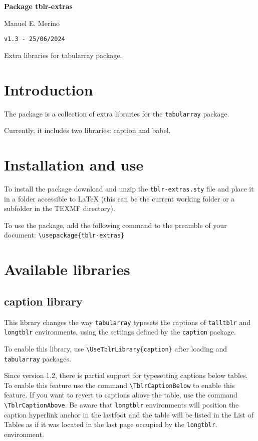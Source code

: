 \documentclass[a4paper,11pt]{article}
\newcommand{\Version}{1.3}
\begin{document}
	\begingroup%
	\centering
	\LARGE\textbf{Package \color{udep}tblr-extras}\par
	\large Manuel E. Merino\par
	\texttt{v\Version{} - 25/06/2024}\par
	\normalsize Extra libraries for tabularray package.\par
	\endgroup
	\tableofcontents
	\clearpage

	\section{Introduction}
	The \tblrextras{} package is a collection of extra libraries for the \texttt{tabularray} package.

	Currently, it includes two libraries: caption and babel.

	\section{Installation and use}

	To install the \tblrextras{} package download and unzip the \texttt{tblr-extras.sty} file and place it in a folder accessible to \LaTeX{} (this can be the current working folder or a subfolder in the TEXMF directory).

	To use the \tblrextras{} package, add the following command to the preamble of your document: \verb|\usepackage{tblr-extras}|

	\section{Available libraries}
	\subsection{caption library}

	This \tblrextras{} library changes the way \texttt{tabularray} typesets the captions of \texttt{talltblr} and \texttt{longtblr} environments, using the settings defined by the \texttt{caption} package.

	To enable this library, use \verb*|\UseTblrLibrary{caption}| after loading \tblrextras{} and \texttt{tabularray} packages.

	Since version 1.2, there is partial support for typesetting captions below tables. To enable this feature use the command \verb|\TblrCaptionBelow| to enable this feature. If you want to revert to captions above the table, use the command \verb|\TblrCaptionAbove|. Be aware that \texttt{longtblr} environments will position the caption hyperlink anchor in the lastfoot and the table will be listed in the List of Tables as if it was located in the last page occupied by the \texttt{longtblr}. environment.
\end{document}
